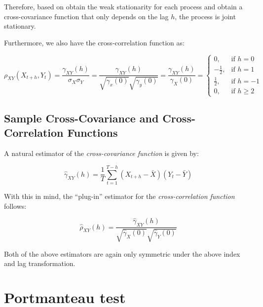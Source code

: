 \documentclass[]{book}
\theoremstyle{definition}
\theoremstyle{definition}
\theoremstyle{definition}
\theoremstyle{remark}
\begin{document}
{Therefore, based on obtain the weak stationarity for each process and
obtain a cross-covariance function that only depends on the lag \(h\),
the process is joint stationary.

Furthermore, we also have the cross-correlation function as:

\[{\rho _{XY}}\left( {{X_{t + h}},{Y_t}} \right) = \frac{{{\gamma _{XY}}\left( h \right)}}{{{\sigma _X}{\sigma _Y}}} = \frac{{{\gamma _{XY}}\left( h \right)}}{{\sqrt {{\gamma _x}\left( 0 \right)} \sqrt {{\gamma _y}\left( 0 \right)} }} = \frac{{{\gamma _{XY}}\left( h \right)}}{{{\gamma _X}\left( 0 \right)}} = \begin{cases}
    0, &\text{if } h = 0 \\
    -\frac{1}{2}, &\text{if } h = 1 \\
    \frac{1}{2}, &\text{if } h = -1 \\
    0, &\text{if } h \ge 2
    \end{cases}\]

\hypertarget{sample-cross-covariance-and-cross-correlation-functions}{%
\subsection{Sample Cross-Covariance and Cross-Correlation
Functions}\label{sample-cross-covariance-and-cross-correlation-functions}}

A natural estimator of the \emph{cross-covariance function} is given by:

\[{{\hat \gamma }_{XY}}\left( h \right) = \frac{1}{T}\sum\limits_{t = 1}^{T - h} {\left( {{X_{t + h}} - \bar X} \right)\left( {{Y_t} - \bar Y} \right)} \]

With this in mind, the ``plug-in'' estimator for the
\emph{cross-correlation function} follows:

\[{{\hat \rho }_{XY}}\left( h \right) = \frac{{{{\hat \gamma }_{XY}}\left( h \right)}}{{\sqrt {{{\hat \gamma }_X}\left( 0 \right)} \sqrt {{{\hat \gamma }_Y}\left( 0 \right)} }}\]

Both of the above estimators are again only symmetric under the above
index and lag transformation.

\hypertarget{portmanteau-test}{%
\section{Portmanteau test}\label{portmanteau-test}}

}
\end{document}
